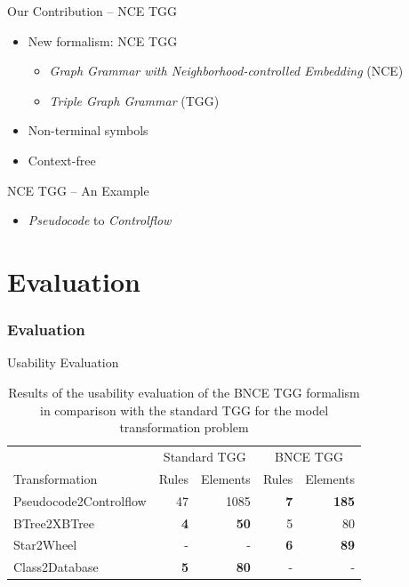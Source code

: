 \documentclass[usenames,dvipsnames]{beamer}
\begin{document}
	\begin{frame}{Our Contribution -- NCE TGG}
		\begin{itemize}
			\item New formalism: NCE TGG
			\begin{itemize}
				\item \emph{Graph Grammar with Neighborhood-controlled Embedding} (NCE) \cite{janssens1982graph}
				\item \emph{Triple Graph Grammar} (TGG) \cite{schurr1994specification}
			\end{itemize}
			\item Non-terminal symbols
			\item Context-free
		\end{itemize}
	\end{frame}
	
	\begin{frame}{NCE TGG -- An Example}
		\begin{itemize}
			\item \emph{Pseudocode} to \emph{Controlflow}
		\end{itemize}
		
		
	\end{frame}
	
	
	
	\section{Evaluation}
	\begin{frame}
		\frametitle{Evaluation}
	\end{frame}
	
	\begin{frame}{Usability Evaluation}
		\footnotesize 
		\begin{table}[h]
			\centering
			\begin{tabular}{l r r r r }
				\hline
				& \multicolumn{2}{c}{Standard TGG} & \multicolumn{2}{c}{BNCE TGG}\\
				Transformation 			& Rules & Elements 	& Rules & Elements\\
				\hline
				Pseudocode2Controlflow	& 47			& 1085	& \textbf{7}	& \textbf{185} \\
				BTree2XBTree			& \textbf{4}	& \textbf{50}	& 5		& 80 \\
				Star2Wheel				& -				& -		& \textbf{6}	& \textbf{89} \\
				Class2Database			& \textbf{5}	& \textbf{80}	& - 	& -  \\
				\hline
			\end{tabular}
			\caption{Results of the usability evaluation of the BNCE TGG formalism in comparison with the standard TGG for the model transformation problem}
		\end{table}
	\end{frame}
	
\end{document}
